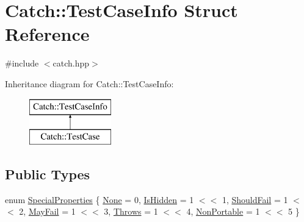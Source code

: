 \hypertarget{struct_catch_1_1_test_case_info}{}\section{Catch\+:\+:Test\+Case\+Info Struct Reference}
\label{struct_catch_1_1_test_case_info}


{\ttfamily \#include $<$catch.\+hpp$>$}

Inheritance diagram for Catch\+:\+:Test\+Case\+Info\+:\begin{figure}[H]
\begin{center}
\leavevmode
\includegraphics[height=2.000000cm]{struct_catch_1_1_test_case_info}
\end{center}
\end{figure}
\subsection*{Public Types}
\begin{DoxyCompactItemize}
\item 
enum \mbox{\hyperlink{struct_catch_1_1_test_case_info_a39b232f74b4a7a6f2183b96759027eac}{Special\+Properties}} \{ \newline
\mbox{\hyperlink{struct_catch_1_1_test_case_info_a39b232f74b4a7a6f2183b96759027eacaf94e9de5f8ec1e53b1aa761ec564b31a}{None}} = 0, 
\mbox{\hyperlink{struct_catch_1_1_test_case_info_a39b232f74b4a7a6f2183b96759027eacaeda53906c14c3973e0980900c132b8f7}{Is\+Hidden}} = 1 $<$$<$ 1, 
\mbox{\hyperlink{struct_catch_1_1_test_case_info_a39b232f74b4a7a6f2183b96759027eacaf9002285bccfc343935958f3953f4c01}{Should\+Fail}} = 1 $<$$<$ 2, 
\mbox{\hyperlink{struct_catch_1_1_test_case_info_a39b232f74b4a7a6f2183b96759027eacadf1873d3271121cb9f52d7df45b416ca}{May\+Fail}} = 1 $<$$<$ 3, 
\newline
\mbox{\hyperlink{struct_catch_1_1_test_case_info_a39b232f74b4a7a6f2183b96759027eaca4704adf89ed7f7ad653d08f99813a974}{Throws}} = 1 $<$$<$ 4, 
\mbox{\hyperlink{struct_catch_1_1_test_case_info_a39b232f74b4a7a6f2183b96759027eaca06472887b53fda9eb8015d74e7fd2cf1}{Non\+Portable}} = 1 $<$$<$ 5
 \}
\end{DoxyCompactItemize}

